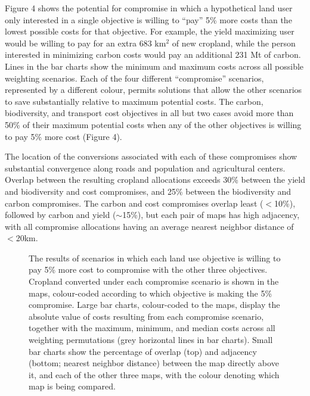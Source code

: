 \documentclass[a4paper]{article}
\begin{document}
{Figure 4 shows the potential for compromise in which a hypothetical land user only interested in a single objective is willing to ``pay'' 5\% more costs than the lowest possible costs for that objective. For example, the yield maximizing user would be willing to pay for an extra 683 km$^2$ of new cropland, while the person interested in minimizing carbon costs would pay an additional 231 Mt of carbon.  Lines in the bar charts show the minimum and maximum costs across all possible weighting scenarios.  Each of the four different ``compromise'' scenarios, represented by a different colour, permits solutions that allow the other scenarios to save substantially relative to maximum potential costs. The carbon, biodiversity, and transport cost objectives in all but two cases avoid more than 50\% of their maximum potential costs when any of the other objectives is willing to pay 5\% more cost (Figure 4).  

The location of the conversions associated with each of these compromises show substantial convergence along roads and population and agricultural centers. Overlap between the resulting cropland allocations exceeds 30\% between the yield and biodiversity and cost compromises, and 25\% between the biodiversity and carbon compromises. The carbon and cost compromises overlap least ($<$10\%), followed by carbon and yield ($\sim$15\%), but each pair of maps has high adjacency, with all compromise allocations having an average nearest neighbor distance of $<$20km.  

\begin{figure}[!ht]
  \begin{center}
    \caption{The results of scenarios in which each land use objective is willing to pay 5\% more cost to compromise with the other three objectives. Cropland converted under each compromise scenario is shown in the maps, colour-coded according to which objective is making the 5\% compromise. Large bar charts, colour-coded to the maps, display the absolute value of costs resulting from each compromise scenario, together with the maximum, minimum, and median costs across all weighting permutations (grey horizontal lines in bar charts). Small bar charts show the percentage of overlap (top) and adjacency (bottom; nearest neighbor distance) between the map directly above it, and each of the other three maps, with the colour denoting which map is being compared.}
    \label{default}
  \end{center}
\end{figure}

}
\end{document}
